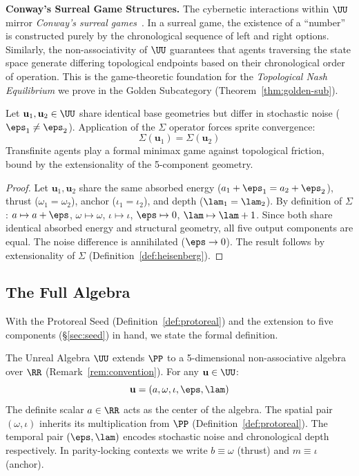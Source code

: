 \textbf{Conway's Surreal Game Structures.} The cybernetic interactions within $\UU$ mirror \emph{Conway's surreal games}~\cite{conway}. In a surreal game, the existence of a ``number'' is constructed purely by the chronological sequence of left and right options. Similarly, the non-associativity of $\UU$ guarantees that agents traversing the state space generate differing topological endpoints based on their chronological order of operation. This is the game-theoretic foundation for the \emph{Topological Nash Equilibrium} we prove in the Golden Subcategory (Theorem~\ref{thm:golden-sub}).

\begin{theorem}\label{thm:game-ext}
Let $\mathbf{u}_1, \mathbf{u}_2 \in \UU$ share identical base geometries but differ in stochastic noise ($\eps_1 \neq \eps_2$). Application of the $\Sigma$ operator forces sprite convergence:
$$\Sigma(\mathbf{u}_1) = \Sigma(\mathbf{u}_2)$$
Transfinite agents play a formal minimax game against topological friction, bound by the extensionality of the 5-component geometry.
\end{theorem}

\begin{proof}
Let $\mathbf{u}_1, \mathbf{u}_2$ share the same absorbed energy ($a_1 + \eps_1 = a_2 + \eps_2$), thrust ($\omega_1 = \omega_2$), anchor ($\iota_1 = \iota_2$), and depth ($\lam_1 = \lam_2$). By definition of $\Sigma$: $a \mapsto a + \eps$, $\omega \mapsto \omega$, $\iota \mapsto \iota$, $\eps \mapsto 0$, $\lam \mapsto \lam + 1$. Since both share identical absorbed energy and structural geometry, all five output components are equal. The noise difference is annihilated ($\eps \to 0$). The result follows by extensionality of $\Sigma$ (Definition~\ref{def:heisenberg}). \qedhere
\end{proof}

\subsection{The Full Algebra}

With the Protoreal Seed (Definition~\ref{def:protoreal}) and the extension to five components (\S\ref{sec:seed}) in hand, we state the formal definition.

\begin{definition}\label{def:heisenberg}
The Unreal Algebra $\UU$ extends $\PP$ to a 5-dimensional non-associative algebra over $\RR$ (Remark~\ref{rem:convention}). For any $\mathbf{u} \in \UU$:
$$\mathbf{u} = (a, \omega, \iota, \eps, \lam)$$
The definite scalar $a \in \RR$ acts as the center of the algebra. The spatial pair $(\omega, \iota)$ inherits its multiplication from $\PP$ (Definition~\ref{def:protoreal}). The temporal pair $(\eps, \lam)$ encodes stochastic noise and chronological depth respectively. In parity-locking contexts we write $b \equiv \omega$ (thrust) and $m \equiv \iota$ (anchor).
\end{definition}

